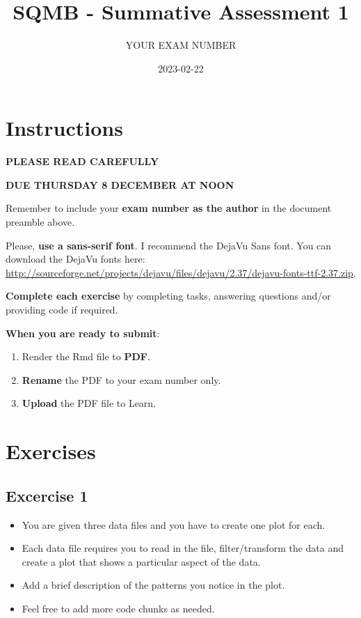 \documentclass[
]{article}
\title{SQMB - Summative Assessment 1}
\author{YOUR EXAM NUMBER}
\date{2023-02-22}
\providecommand{\tightlist}{%
  \setlength{\itemsep}{0pt}\setlength{\parskip}{0pt}}
\begin{document}
\maketitle

\hypertarget{instructions}{%
\section{Instructions}\label{instructions}}

\textbf{PLEASE READ CAREFULLY}

\textbf{DUE THURSDAY 8 DECEMBER AT NOON}

Remember to include your \textbf{exam number as the author} in the
document preamble above.

Please, \textbf{use a sans-serif font}. I recommend the DejaVu Sans
font. You can download the DejaVu fonts here:
\url{http://sourceforge.net/projects/dejavu/files/dejavu/2.37/dejavu-fonts-ttf-2.37.zip}.

\textbf{Complete each exercise} by completing tasks, answering questions
and/or providing code if required.

\textbf{When you are ready to submit}:

\begin{enumerate}
\def\labelenumi{\arabic{enumi}.}
\tightlist
\item
  Render the Rmd file to \textbf{PDF}.
\item
  \textbf{Rename} the PDF to your exam number only.
\item
  \textbf{Upload} the PDF file to Learn.
\end{enumerate}

\hypertarget{exercises}{%
\section{Exercises}\label{exercises}}

\hypertarget{excercise-1}{%
\subsection{Excercise 1}\label{excercise-1}}

\begin{itemize}
\tightlist
\item
  You are given three data files and you have to create one plot for
  each.
\item
  Each data file requires you to read in the file, filter/transform the
  data and create a plot that shows a particular aspect of the data.
\item
  Add a brief description of the patterns you notice in the plot.
\item
  Feel free to add more code chunks as needed.
\end{itemize}
\end{document}
